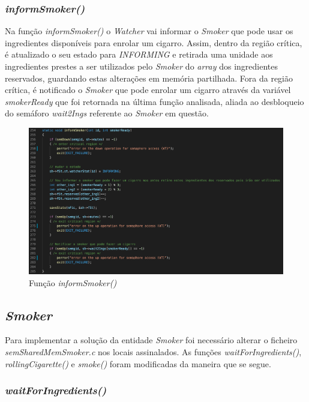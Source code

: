\documentclass[10pt,portuguese]{article}
\begin{document}
\subsubsection{\textit{informSmoker()}}

\par Na função \textit{informSmoker()} o \textit{Watcher} vai informar o \textit{Smoker} que pode usar os ingredientes disponíveis para enrolar um cigarro. Assim, dentro da região crítica, é atualizado o seu estado para \textit{INFORMING} e retirada uma unidade aos ingredientes prestes a ser utilizados pelo \textit{Smoker} do \textit{array} dos ingredientes reservados, guardando estas alterações em memória partilhada. Fora da região crítica, é notificado o \textit{Smoker} que pode enrolar um cigarro através da variável \textit{smokerReady} que foi retornada na última função analisada, aliada ao desbloqueio do semáforo \textit{wait2Ings} referente ao \textit{Smoker} em questão.

\begin{figure}[!h]
    \centering
    \includegraphics[width=\textwidth]{images/implementation/informsmok.png}
    \caption{Função \textit{informSmoker()}}
\end{figure}

\subsection{\textit{Smoker}}
\par Para implementar a solução da entidade \textit{Smoker} foi necessário alterar o ficheiro \textit{semSharedMemSmoker.c} nos locais assinalados. As funções \textit{waitForIngredients()}, \textit{rollingCigarette()} e \textit{smoke()} foram modificadas da maneira que se segue.

\subsubsection{\textit{waitForIngredients()}}
\end{document}
